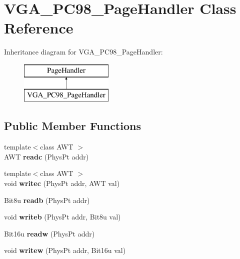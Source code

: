 \hypertarget{classVGA__PC98__PageHandler}{\section{V\-G\-A\-\_\-\-P\-C98\-\_\-\-Page\-Handler Class Reference}
\label{classVGA__PC98__PageHandler}
}
Inheritance diagram for V\-G\-A\-\_\-\-P\-C98\-\_\-\-Page\-Handler\-:\begin{figure}[H]
\begin{center}
\leavevmode
\includegraphics[height=2.000000cm]{classVGA__PC98__PageHandler}
\end{center}
\end{figure}
\subsection*{Public Member Functions}
\begin{DoxyCompactItemize}
\item 
\hypertarget{classVGA__PC98__PageHandler_aeb70f364aa5ef8ea40607625b7786e9f}{{\footnotesize template$<$class A\-W\-T $>$ }\\A\-W\-T {\bfseries readc} (Phys\-Pt addr)}\label{classVGA__PC98__PageHandler_aeb70f364aa5ef8ea40607625b7786e9f}

\item 
\hypertarget{classVGA__PC98__PageHandler_a4e6b6c2642bd7e3167898f6202428929}{{\footnotesize template$<$class A\-W\-T $>$ }\\void {\bfseries writec} (Phys\-Pt addr, A\-W\-T val)}\label{classVGA__PC98__PageHandler_a4e6b6c2642bd7e3167898f6202428929}

\item 
\hypertarget{classVGA__PC98__PageHandler_a7383d9dcfae6ce47144de25274c4e2e0}{Bit8u {\bfseries readb} (Phys\-Pt addr)}\label{classVGA__PC98__PageHandler_a7383d9dcfae6ce47144de25274c4e2e0}

\item 
\hypertarget{classVGA__PC98__PageHandler_ae4218d76e784f30f61550cf69fb13faa}{void {\bfseries writeb} (Phys\-Pt addr, Bit8u val)}\label{classVGA__PC98__PageHandler_ae4218d76e784f30f61550cf69fb13faa}

\item 
\hypertarget{classVGA__PC98__PageHandler_a81abc040259aa8ac35d2f0e0d7d848eb}{Bit16u {\bfseries readw} (Phys\-Pt addr)}\label{classVGA__PC98__PageHandler_a81abc040259aa8ac35d2f0e0d7d848eb}

\item 
\hypertarget{classVGA__PC98__PageHandler_a2477be297bcfdf72be8724174aafd508}{void {\bfseries writew} (Phys\-Pt addr, Bit16u val)}\label{classVGA__PC98__PageHandler_a2477be297bcfdf72be8724174aafd508}

\end{DoxyCompactItemize}
